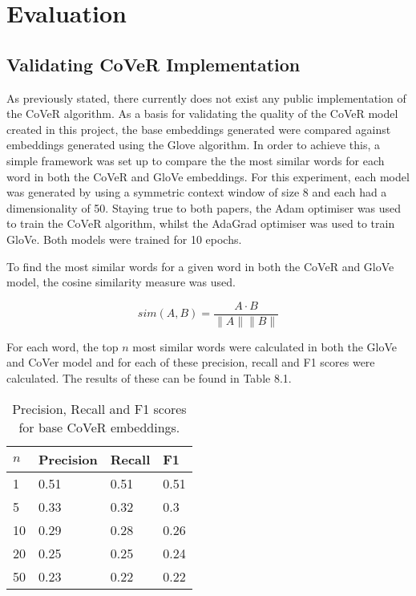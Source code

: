 \chapter{Evaluation}
\label{chap:evaluation}
\section{Validating CoVeR Implementation}
As previously stated, there currently does not exist any public implementation of the CoVeR algorithm. As a basis for validating the quality of the CoVeR model created in this project, the base embeddings generated were compared against embeddings generated using the Glove algorithm. In order to achieve this, a simple framework was set up to compare the the most similar words for each word in both the CoVeR and GloVe embeddings. For this experiment, each model was generated by using a symmetric context window of size 8 and each had a dimensionality of 50. Staying true to both papers, the Adam optimiser was used to train the CoVeR algorithm, whilst the AdaGrad optimiser was used to train GloVe. Both models were trained for 10 epochs. 

\noindent
\newline
To find the most similar words for a given word in both the CoVeR and GloVe model, the cosine similarity measure was used. 

\begin{equation}
sim(A, B) =\dfrac{A \cdot B}{\lVert A \rVert \lVert B \rVert}
\end{equation}

\noindent
For each word, the top \(n\) most similar words were calculated in both the GloVe and CoVer model and for each of these precision, recall and F1 scores were calculated. The results of these can be found in Table 8.1.

\begin{table}[ht]
	\centering
	\begin{tabular}{ | l | l | l | l | }
		\hline
		\textbf{\(n\)} & \textbf{Precision} & \textbf{Recall}  & \textbf{F1}\\ \hline
		1 & 0.51 & 0.51 & 0.51\\ \hline
		5 & 0.33 & 0.32 & 0.3\\ \hline
		10 & 0.29 & 0.28 & 0.26\\ \hline
		20 & 0.25 & 0.25 & 0.24\\ \hline
		50 & 0.23 & 0.22 & 0.22\\ \hline
	\end{tabular}
	\label{Tab:CoverPRF}
	\caption[Precision, Recall and F1 Scores for Base CoVeR Embeddings]{Precision, Recall and F1 scores for base CoVeR embeddings.}
\end{table}


